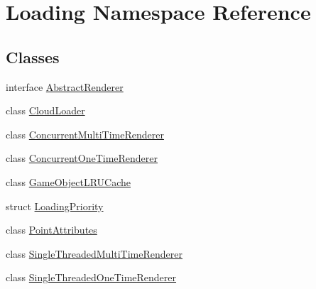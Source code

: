 \hypertarget{namespace_loading}{}\section{Loading Namespace Reference}
\label{namespace_loading}
\subsection*{Classes}
\begin{DoxyCompactItemize}
\item 
interface \hyperlink{interface_loading_1_1_abstract_renderer}{Abstract\+Renderer}
\item 
class \hyperlink{class_loading_1_1_cloud_loader}{Cloud\+Loader}
\item 
class \hyperlink{class_loading_1_1_concurrent_multi_time_renderer}{Concurrent\+Multi\+Time\+Renderer}
\item 
class \hyperlink{class_loading_1_1_concurrent_one_time_renderer}{Concurrent\+One\+Time\+Renderer}
\item 
class \hyperlink{class_loading_1_1_game_object_l_r_u_cache}{Game\+Object\+L\+R\+U\+Cache}
\item 
struct \hyperlink{struct_loading_1_1_loading_priority}{Loading\+Priority}
\item 
class \hyperlink{class_loading_1_1_point_attributes}{Point\+Attributes}
\item 
class \hyperlink{class_loading_1_1_single_threaded_multi_time_renderer}{Single\+Threaded\+Multi\+Time\+Renderer}
\item 
class \hyperlink{class_loading_1_1_single_threaded_one_time_renderer}{Single\+Threaded\+One\+Time\+Renderer}
\end{DoxyCompactItemize}
